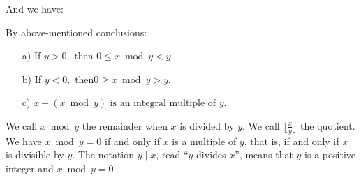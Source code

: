 And we have:
\begin{corollary}
    By above-mentioned conclusions:
    \begin{itemize}
        \item[a)] If $y > 0, \text{ then } 0 \leq x \bmod y < y$.
        \item[b)] If $y < 0, \text{ then}  0 \geq x \bmod y > y$.
        \item[c)]  $x - (x \bmod y) \text{ is an integral multiple of } y$.
    \end{itemize}
\end{corollary}
We call $x \bmod y$ the remainder when $x$ is divided by $y$. We call $\lfloor \frac{x}{y} \rfloor$ the quotient.
We have \( x \bmod y = 0 \) if and only if \( x \) is a multiple of \( y \), that is, if and only if \( x \) is divisible by \( y \). The notation \( y \mid x \), read ``\( y \) divides \( x \)'', means that \( y \) is a positive integer and \( x \bmod y = 0 \).
